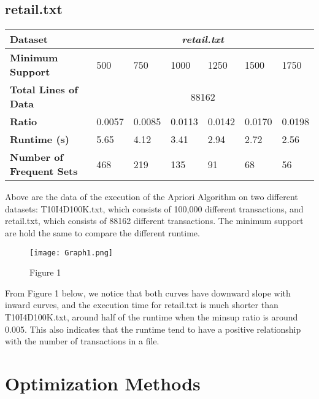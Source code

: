 \documentclass[12pt]{article}
\begin{document}
\subsection*{retail.txt}
\begin{table}[h]
\begin{tabular}{|l|l|l|l|l|l|l|}
\hline
\textbf{Dataset}                 & \multicolumn{6}{c|}{\textit{retail.txt}}            \\ \hline
\textbf{Minimum Support}         & 500    & 750    & 1000   & 1250   & 1500   & 1750   \\ \hline
\textbf{Total Lines of Data}     & \multicolumn{6}{c|}{88162}                          \\ \hline
\textbf{Ratio}                   & 0.0057 & 0.0085 & 0.0113 & 0.0142 & 0.0170 & 0.0198 \\ \hline
\textbf{Runtime (s)}             & 5.65   & 4.12   & 3.41   & 2.94   & 2.72   & 2.56   \\ \hline
\textbf{Number of Frequent Sets} & 468    & 219    & 135    & 91     & 68     & 56     \\ \hline
\end{tabular}
\end{table}

\begin{flushleft}
Above are the data of the execution of the Apriori Algorithm on two different datasets: T10I4D100K.txt, which consists of 100,000 different transactions, and retail.txt, which consists of 88162 different transactions. The minimum support are hold the same to compare the different runtime.
\end{flushleft}


\begin{figure}[h]
    \centering
    \texttt{[image: Graph1.png]}
    \caption{Figure 1}
    \label{Min Sup Ratio vs Runtime}
\end{figure}

\begin{flushleft}
From Figure 1 below, we notice that both curves have downward slope with inward curves, and the execution time for retail.txt is much shorter than T10I4D100K.txt, around half of the runtime when the minsup ratio is around 0.005. This also indicates that the runtime tend to have a positive relationship with the number of transactions in a file.
\end{flushleft}

\section*{Optimization Methods}
\end{document}
